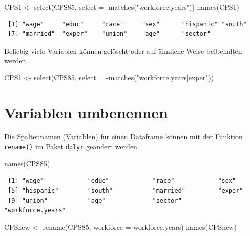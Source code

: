 \documentclass[
  ngerman,
]{scrbook}
\newenvironment{Shaded}{\begin{snugshade}}{\end{snugshade}}
\newcommand{\AttributeTok}[1]{\textcolor[rgb]{0.77,0.63,0.00}{#1}}
\newcommand{\FunctionTok}[1]{\textcolor[rgb]{0.00,0.00,0.00}{#1}}
\newcommand{\NormalTok}[1]{#1}
\newcommand{\OtherTok}[1]{\textcolor[rgb]{0.56,0.35,0.01}{#1}}
\newcommand{\SpecialCharTok}[1]{\textcolor[rgb]{0.00,0.00,0.00}{#1}}
\newcommand{\StringTok}[1]{\textcolor[rgb]{0.31,0.60,0.02}{#1}}
\begin{document}
\begin{Shaded}
\begin{Highlighting}[]
\NormalTok{CPS1 }\OtherTok{\textless{}{-}} \FunctionTok{select}\NormalTok{(CPS85, }\AttributeTok{select =} \SpecialCharTok{{-}}\FunctionTok{matches}\NormalTok{(}\StringTok{"workforce.years"}\NormalTok{))}
\FunctionTok{names}\NormalTok{(CPS1)}
\end{Highlighting}
\end{Shaded}

\begin{verbatim}
 [1] "wage"     "educ"     "race"     "sex"      "hispanic" "south"   
 [7] "married"  "exper"    "union"    "age"      "sector"  
\end{verbatim}

Beliebig viele Variablen können gelöscht oder auf ähnliche Weise beibehalten werden.

\begin{Shaded}
\begin{Highlighting}[]
\NormalTok{CPS1 }\OtherTok{\textless{}{-}} \FunctionTok{select}\NormalTok{(CPS85, }\AttributeTok{select =} \SpecialCharTok{{-}}\FunctionTok{matches}\NormalTok{(}\StringTok{"workforce.years|exper"}\NormalTok{))}
\end{Highlighting}
\end{Shaded}

\hypertarget{variablen-umbenennen}{%
\section{Variablen umbenennen}\label{variablen-umbenennen}}

Die Spaltennamen (Variablen) für einen Dataframe können mit der Funktion \texttt{rename()} im Paket \texttt{dplyr} geändert werden.

\begin{Shaded}
\begin{Highlighting}[]
\FunctionTok{names}\NormalTok{(CPS85)}
\end{Highlighting}
\end{Shaded}

\begin{verbatim}
 [1] "wage"            "educ"            "race"            "sex"            
 [5] "hispanic"        "south"           "married"         "exper"          
 [9] "union"           "age"             "sector"          "workforce.years"
\end{verbatim}

\begin{Shaded}
\begin{Highlighting}[]
\NormalTok{CPSnew }\OtherTok{\textless{}{-}} \FunctionTok{rename}\NormalTok{(CPS85, }\AttributeTok{workforce =}\NormalTok{ workforce.years)}
\FunctionTok{names}\NormalTok{(CPSnew)}
\end{Highlighting}
\end{Shaded}
\end{document}
